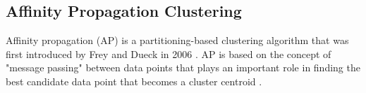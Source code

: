 




\subsection{Affinity Propagation Clustering}

Affinity propagation (AP) is a partitioning-based clustering algorithm that was first introduced by Frey and Dueck in 2006 \cite{frey2006mixture}. AP is based on the concept of "message passing" between data points that plays an important role in finding the best candidate data point that becomes a cluster centroid \cite{frey2007clustering, jiang2019exemplar}. 





